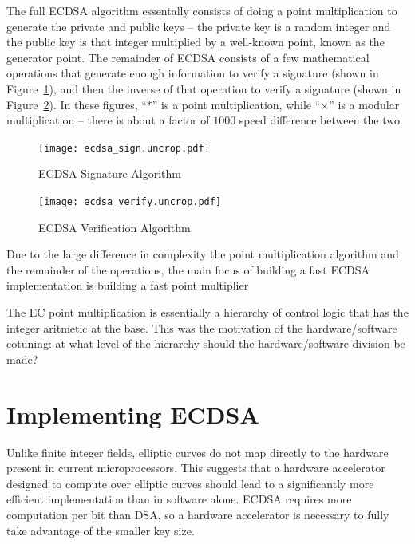 \documentclass[twocolumn]{article}
\begin{document}
The full ECDSA algorithm essentally consists of doing a point
multiplication to generate the private and public keys -- the private
key is a random integer and the public key is that integer multiplied
by a well-known point, known as the generator point.  The remainder of
ECDSA consists of a few mathematical operations that generate enough
information to verify a signature (shown in Figure~\ref{ecdsa-sign}),
and then the inverse of that operation to verify a signature (shown in
Figure~\ref{ecdsa-verify}).  In these figures, ``$*$'' is a point
multiplication, while ``$\times$'' is a modular multiplication --
there is about a factor of $1000$ speed difference between the two.

\begin{figure}[ht]
  \begin{center}
    \texttt{[image: ecdsa\_sign.uncrop.pdf]}
  \end{center}

  \caption{ECDSA Signature Algorithm
    \label{ecdsa-sign}}
\end{figure}

\begin{figure}[ht]
  \begin{center}
    \texttt{[image: ecdsa\_verify.uncrop.pdf]}
  \end{center}

  \caption{ECDSA Verification Algorithm
    \label{ecdsa-verify}}
\end{figure}

Due to the large difference in complexity the point multiplication
algorithm and the remainder of the operations, the main focus of
building a fast ECDSA implementation is building a fast point multiplier

The EC point multiplication is essentially a hierarchy of control
logic that has the integer aritmetic at the base. This was the
motivation of the hardware/software cotuning: at what level of the
hierarchy should the hardware/software division be made?

\section{Implementing ECDSA}

Unlike finite integer fields, elliptic curves do not map directly to
the hardware present in current microprocessors\cite{kss-ecdsa}. This
suggests that a hardware accelerator designed to compute over elliptic
curves should lead to a significantly more efficient implementation
than in software alone.  ECDSA requires more computation per bit than
DSA, so a hardware accelerator is necessary to fully take advantage of
the smaller key size.
\end{document}
